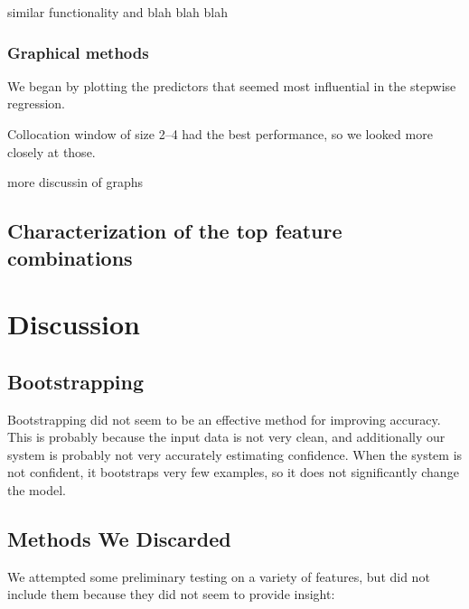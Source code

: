 \documentclass{article}
\begin{document}


similar functionality and blah blah blah

\subsubsection{Graphical methods}
We began by plotting the predictors that seemed most influential in the
stepwise regression.


Collocation window of size 2--4 had the best performance, so we looked more closely at those.


more discussin of graphs


\subsection{Characterization of the top feature combinations}


\section{Discussion}

\subsection{Bootstrapping}

Bootstrapping did not seem to be an effective method for improving accuracy.  This is probably because the input data is not very clean, and additionally our system is probably not very accurately estimating confidence.  When the system is not confident, it bootstraps very few examples, so it does not significantly change the model.

\subsection{Methods We Discarded}

We attempted some preliminary testing on a variety of features, but did not include them because they did not seem to provide insight:
\end{document}

